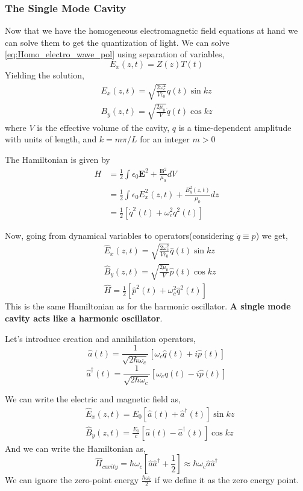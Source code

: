 \documentclass[english, a4paper, 12pt, twoside]{article}
\numberwithin{equation}{section} %
\begin{document}
\subsubsection{The Single Mode Cavity}
Now that we have the homogeneous electromagnetic field equations at hand we can solve them to get the quantization of light.
We can solve \ref{eq:Homo_electro_wave_pol} using separation of variables,
$$E_x(z, t)= Z(z)T(t)$$
Yielding the solution,
\begin{equation}
    \begin{split}
        E_x(z, t) = \sqrt{\frac{2 \omega_c^2}{V \epsilon_0}}q(t)\sin{kz} \\
        B_y(z, t) = \sqrt{\frac{2 \mu_0}{V}}\dot{q}(t)\cos{kz}
    \end{split}
\end{equation}
where $V$ is the effective volume of the cavity, $q$ is a time-dependent amplitude with units of length, and $k = m\pi/L$ for
an integer $m > 0$

The Hamiltonian is given by
\begin{align}
    H &= \frac{1}{2}\int\epsilon_0 \textbf{E}^2 + \frac{\textbf{B}^2}{\mu_0} dV \\
    &= \frac{1}{2}\int\epsilon_0 E_x^2(z, t) + \frac{B_y^2(z, t)}{\mu_0} dz \\
    &= \frac{1}{2}[\dot{q}^2(t) + \omega_c^2 q^2(t)]
\end{align}

Now, going from dynamical variables to operators(considering $\dot{q} \equiv p$) we get,
\begin{align}
     &\hat{E}_x(z, t) = \sqrt{\frac{2 \omega_c^2}{V \epsilon_0}}\hat{q}(t)\sin{kz} \\
     &\hat{B}_y(z, t) = \sqrt{\frac{2 \mu_0}{V}}\hat{p}(t)\cos{kz} \\
     &\hat{H} = \frac{1}{2}[\hat{p}^2(t) + \omega_c^2 \hat{q}^2(t)]
\end{align}
This is the same Hamiltonian as for the harmonic oscillator. \textbf{A single mode cavity acts like a harmonic oscillator}.

Let’s introduce creation and annihilation operators,
$$\hat{a}(t) = \frac{1}{\sqrt{2\hbar\omega_c}}[\omega_c\hat{q}(t) + i\hat{p}(t)]$$
$$\hat{a}^\dag(t) = \frac{1}{\sqrt{2\hbar\omega_c}}[\omega_c\hat{q}(t) - i\hat{p}(t)]$$

We can write the electric and magnetic field as,
\begin{align}
         &\hat{E}_x(   z, t) = E_0[\hat{a}(t) + \hat{a}^\dag(t)]\sin{kz} \\
         &\hat{B}_y(z, t) = \frac{E_0}{c}[\hat{a}(t) - \hat{a}^\dag(t)]\cos{kz}
\end{align}
And we can write the Hamiltonian as,
\begin{equation}\label{eq:cavity_hamiltonian}
    \hat{H}_{cavity} = \hbar\omega_c[\hat{a}\hat{a}^\dag + \frac{1}{2}] \approx \hbar\omega_c\hat{a}\hat{a}^\dag
\end{equation}
We can ignore the zero-point energy $\frac{\hbar\omega_c}{2}$ if we define it as the zero energy point.
\end{document}
